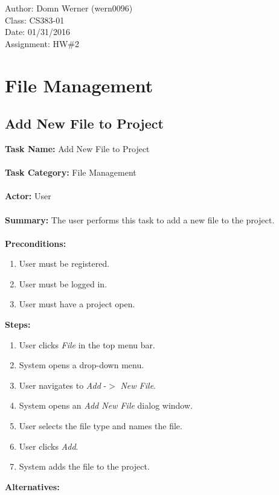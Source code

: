 \documentclass[14pt, a4paper]{article}
\begin{document}
\noindent Author: Domn Werner (wern0096) \\
Class: CS383-01 \\
Date: 01/31/2016 \\
Assignment: HW\#2

\tableofcontents

\newpage

\section{File Management}

\subsection{Add New File to Project}

\begin{framed}
	\noindent\textbf{Task Name:} Add New File to Project \\ \\
	\textbf{Task Category:} File Management \\ \\
	\textbf{Actor:} User \\ \\
	\textbf{Summary:} The user performs this task to add a new file to the project. \\ \\
	\textbf{Preconditions:} 
	\begin{enumerate}
		\item User must be registered.
		\item User must be logged in.
		\item User must have a project open.
	\end{enumerate}
	\textbf{Steps:}
	\begin{enumerate}
		\item User clicks \textit{File} in the top menu bar.
		\item System opens a drop-down menu.
		\item User navigates to \textit{Add} -$>$ \textit{New File}.
		\item System opens an \textit{Add New File} dialog window.
		\item User selects the file type and names the file.
		\item User clicks \textit{Add}.
		\item System adds the file to the project.
	\end{enumerate}
	\textbf{Alternatives:} 
	\begin{enumerate}

\end{enumerate}
\end{framed}
\end{document}
